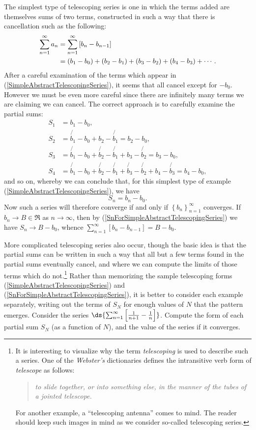 The simplest type of telescoping series is one in which
the terms added are themselves sums of two terms, constructed
in such a way that there is cancellation such as the following:
\begin{align}
\sum_{n=1}^\infty a_n&=\sum_{n=1}^\infty
\left[b_n-b_{n-1}\right]\label{SimpleAbstractTelescopingSeries}\\
&=\left(b_1-b_0\right)+\left(b_2-b_1\right)+\left(b_3-b_2\right)
+\left(b_4-b_3\right)+\cdots.\notag\end{align}
After a careful examination of the terms which appear in 
(\ref{SimpleAbstractTelescopingSeries}), it seems that
all cancel except for $-b_0$. However we must be even more
careful since there are infinitely many terms we are claiming
we can cancel.  The correct approach is to carefully examine the partial 
sums:
\begin{align*}
S_1&=b_1-b_0,\\
S_2&=\not{b_1}-b_0+b_2-\not{b_1}=b_2-b_0,\\
S_3&=\not{b_1}-b_0+\not{b_2}-\not{b_1}+b_3-\not{b_2}=b_3-b_0,\\
S_4&=\not{b_1}-b_0+\not{b_2}-\not{b_1}+\not{b_3}-\not{b_2}
   +b_4-\not{b_3}=b_4-b_0,\end{align*}
and so on, whereby we can conclude that, for this simplest type
of example (\ref{SimpleAbstractTelescopingSeries}), we have
\begin{equation}
S_n=b_n-b_0.\label{SnForSimpleAbstractTelescopingSeries}
\end{equation}
Now such a series will therefore converge if and 
only if $\left\{b_n\right\}_{n=1}^\infty$ converges.
If $b_n\longrightarrow B\in\Re$ as $n\to\infty$, then
by (\ref{SnForSimpleAbstractTelescopingSeries}) we have
$S_n\longrightarrow B-b_0$, whence
$\sum_{n=1}^\infty\left[b_n-b_{n-1}\right]=B-b_0$.

More complicated telescoping series also occur, though the
basic idea is that the partial sums can be written
in such a way that all but a few terms found in the partial sums
eventually cancel,
and where we can compute the limits of those terms which do not.\footnote{%
It is interesting to visualize why the term {\it telescoping}
is used to describe such a series.  
One of the {\it Webster's} dictionaries defines 
the intransitive verb form of {\it telescope} as follows:
\begin{quote}
{\it to slide together, or into something else, in the manner of the
tubes of a jointed telescope.}\end{quote}
For another example, a ``telescoping antenna'' comes to mind.
The reader should keep such images in mind as we consider 
so-called telescoping series.
} Rather than memorizing the sample telescoping
forms (\ref{SimpleAbstractTelescopingSeries})
and (\ref{SnForSimpleAbstractTelescopingSeries}), it is better to 
consider each example separately, writing out the terms of $S_N$
for enough values of $N$ that the pattern emerges.
\bex Consider the series $\ds{\sum_{n=1}^\infty\left[\frac1{n+1}-\frac1n\right]
}$.  Compute the form of each partial sum $S_N$ (as a function of $N$), and
the value of the series if it converges.

